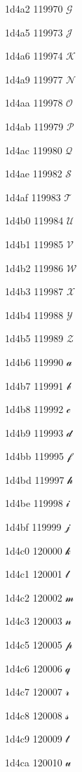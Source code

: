 \documentclass[11pt]{article}
\begin{document}
1d4a2 119970 \ensuremath{\mathscr{G}}

1d4a5 119973 \ensuremath{\mathscr{J}}

1d4a6 119974 \ensuremath{\mathscr{K}}

1d4a9 119977 \ensuremath{\mathscr{N}}

1d4aa 119978 \ensuremath{\mathscr{O}}

1d4ab 119979 \ensuremath{\mathscr{P}}

1d4ac 119980 \ensuremath{\mathscr{Q}}

1d4ae 119982 \ensuremath{\mathscr{S}}

1d4af 119983 \ensuremath{\mathscr{T}}

1d4b0 119984 \ensuremath{\mathscr{U}}

1d4b1 119985 \ensuremath{\mathscr{V}}

1d4b2 119986 \ensuremath{\mathscr{W}}

1d4b3 119987 \ensuremath{\mathscr{X}}

1d4b4 119988 \ensuremath{\mathscr{Y}}

1d4b5 119989 \ensuremath{\mathscr{Z}}

1d4b6 119990 \ensuremath{\mathscr{a}}

1d4b7 119991 \ensuremath{\mathscr{b}}

1d4b8 119992 \ensuremath{\mathscr{c}}

1d4b9 119993 \ensuremath{\mathscr{d}}

1d4bb 119995 \ensuremath{\mathscr{f}}

1d4bd 119997 \ensuremath{\mathscr{h}}

1d4be 119998 \ensuremath{\mathscr{i}}

1d4bf 119999 \ensuremath{\mathscr{j}}

1d4c0 120000 \ensuremath{\mathscr{k}}

1d4c1 120001 \ensuremath{\mathscr{l}}

1d4c2 120002 \ensuremath{\mathscr{m}}

1d4c3 120003 \ensuremath{\mathscr{n}}

1d4c5 120005 \ensuremath{\mathscr{p}}

1d4c6 120006 \ensuremath{\mathscr{q}}

1d4c7 120007 \ensuremath{\mathscr{r}}

1d4c8 120008 \ensuremath{\mathscr{s}}

1d4c9 120009 \ensuremath{\mathscr{t}}

1d4ca 120010 \ensuremath{\mathscr{u}}
\end{document}
